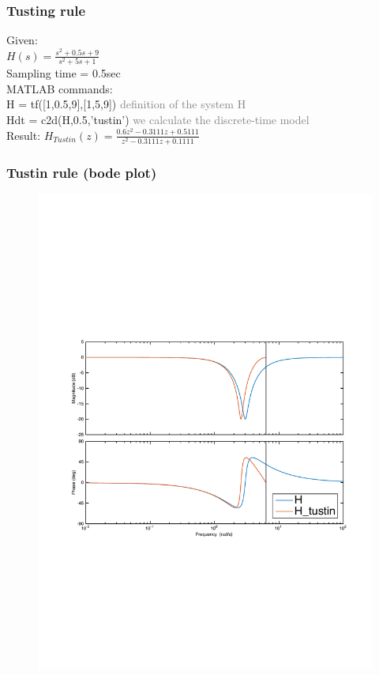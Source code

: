 \begin{frame}
	\frametitle{Tusting rule}
	\begin{example}
		Given:\\
		$H(s) = \frac{s^{2} + 0.5s + 9}{s^{2} + 5s + 1}$\\
		Sampling time = 0.5sec\\
		\vspace{1em}
		MATLAB commands:\\
		
		H = tf([1,0.5,9],[1,5,9])	\textcolor{gray}{definition of the system H} \\
		Hdt = c2d(H,0.5,'tustin')	\textcolor{gray}{we calculate the discrete-time model}\\
		\vspace{1em}
		Result: 
		$H_{Tustin}(z) = \frac{0.6z^{2} - 0.3111z + 0.5111}{z^{2} -  0.3111z + 0.1111}$
	\end{example}
\end{frame}

\begin{frame}
	\frametitle{Tustin rule (bode plot)}
	\vspace{-0.7em}
	\begin{figure}
		\centering
		\includegraphics[width=0.9\linewidth]{distortion_bode2}
	\end{figure}
\end{frame}

